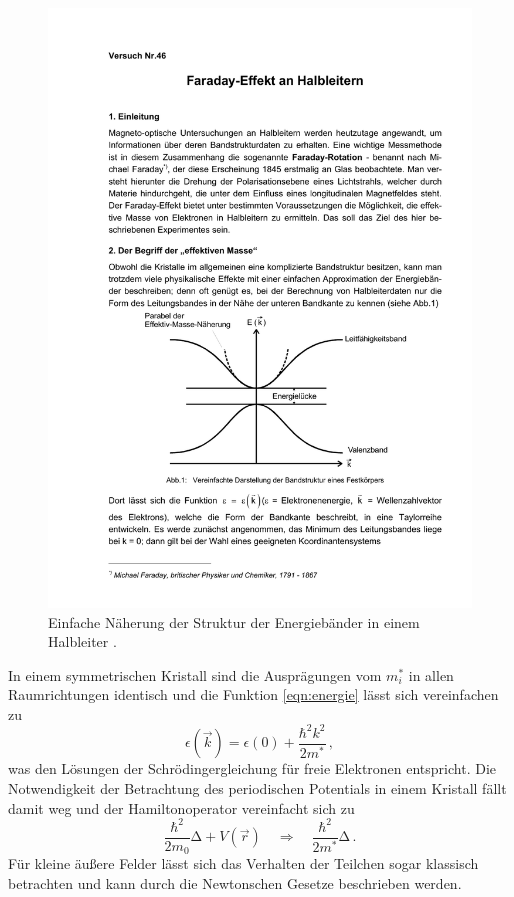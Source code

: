 \begin{figure}[h]
    \centering
    \includegraphics[width=0.8\linewidth]{img/band.pdf}
    \caption{
        Einfache Näherung der Struktur der Energiebänder in einem Halbleiter
        \cite{V46}.
    }
    \label{fig:band}
\end{figure}
In einem symmetrischen Kristall sind die Ausprägungen vom $m_i^*$ in allen
Raumrichtungen identisch und die Funktion \eqref{eqn:energie} lässt sich
vereinfachen zu
\begin{equation}
    \label{eqn:energie_einfach}
    \epsilon\left(\vec{k}\right) = \epsilon(0) + \frac{\hbar^2k^2}{2m^*}\,,
\end{equation}
was den Lösungen der Schrödingergleichung für freie Elektronen entspricht.
Die Notwendigkeit der Betrachtung des periodischen Potentials in einem Kristall
fällt damit weg und der Hamiltonoperator vereinfacht sich zu
\begin{equation*}
    \frac{\hbar^2}{2m_0}\mathrm{\Delta} + V(\vec{r})
    \quad\Rightarrow\quad
    \frac{\hbar^2}{2m^*}\mathrm{\Delta}\,.
\end{equation*}
Für kleine äußere Felder lässt sich das Verhalten der Teilchen sogar
klassisch betrachten und kann durch die Newtonschen Gesetze beschrieben
werden.

